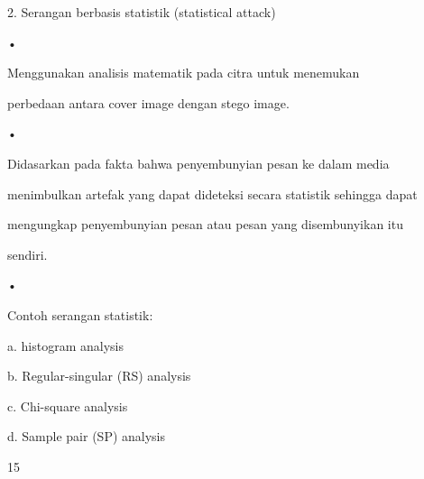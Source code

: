 \documentclass{article}
\begin{document}

2.  Serangan berbasis statistik (statistical attack)

•

Menggunakan analisis matematik pada citra untuk menemukan 

perbedaan antara cover image dengan stego image. 

•

Didasarkan pada fakta bahwa penyembunyian pesan ke dalam media 

menimbulkan artefak yang dapat dideteksi secara statistik sehingga dapat 

mengungkap penyembunyian pesan atau pesan yang disembunyikan itu 

sendiri.

•

Contoh serangan statistik: 


a. histogram analysis


b. Regular-singular (RS) analysis


c. Chi-square analysis 


 d. Sample pair (SP) analysis 

15
\end{document}
